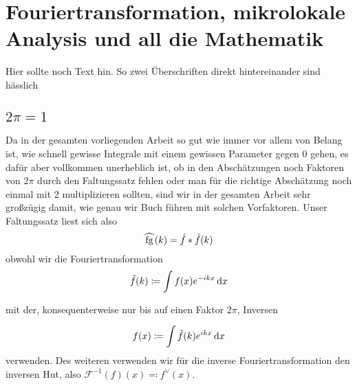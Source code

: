 
\section{Fouriertransformation, mikrolokale Analysis und all die Mathematik} %
\label{sec:fouriertransformation_mikrolokale_analysis_und_all_die_mathematik}

Hier sollte noch Text hin. So zwei Überschriften direkt hintereinander sind hässlich

\subsection{\texorpdfstring{$2 \pi = 1$}{2 Pi = 1}}
Da in der gesamten vorliegenden Arbeit so gut wie immer vor allem von Belang ist, wie schnell gewisse Integrale mit einem gewissen Parameter gegen 0 gehen, es dafür aber vollkommen unerheblich ist, ob in den Abschätzungen noch Faktoren von $2 \pi$ durch den Faltungssatz fehlen oder man für die richtige Abschätzung noch einmal mit 2 multiplizieren  sollten, sind wir in der gesamten Arbeit sehr großzügig damit, wie genau wir Buch führen mit solchen Vorfaktoren. Unser Faltungssatz liest sich also
\begin{equation*}
    \rwhat{fg} (k) = \hat f \ast \hat f (k)
\end{equation*}
obwohl wir die Fouriertransformation
\begin{equation*}
    \hat f (k) \coloneqq \int f(x)e^{-ikx} \mathop{}\!\mathrm{d} x
\end{equation*}

mit der, konsequenterweise nur bis auf einen Faktor $2 \pi$, Inversen

\begin{equation*}
    f (x) \coloneqq \int \hat f(k)e^{ikx} \mathop{}\!\mathrm{d} x
\end{equation*}
verwenden. Des weiteren verwenden wir für die inverse Fouriertransformation den inversen Hut, also $\mathcal{F}^{-1}(f)(x) \eqqcolon f^\vee (x)$.


